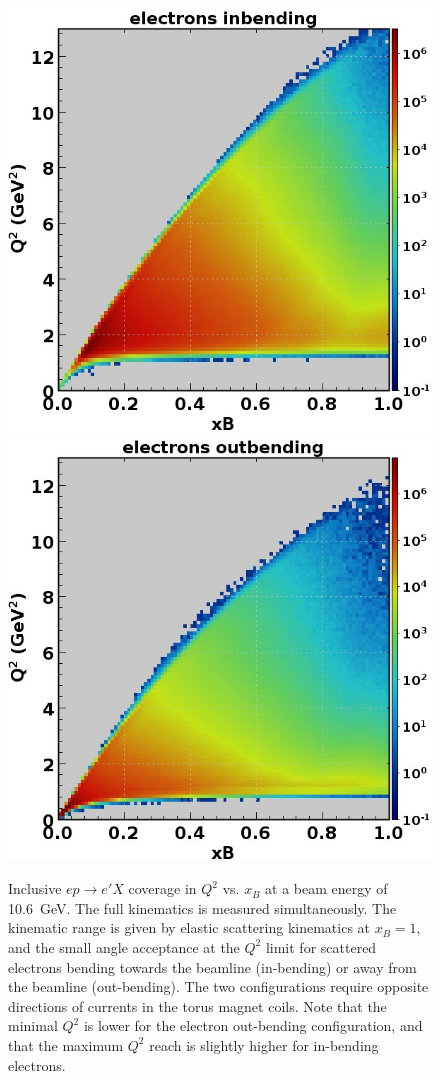 \documentclass[final,3p,twocolumn]{elsarticle}
\begin{document}
\begin{figure}[th!]
\includegraphics[width=0.9\columnwidth]{epX-in.jpg}
\vspace{0.3cm}
\includegraphics[width=0.9\columnwidth]{epX-out.jpg}
\caption{Inclusive $ep \to e'X$ coverage in $Q^2$ vs. $x_B$ at a beam energy of 10.6~GeV. The full kinematics is
  measured simultaneously. The kinematic range is given by elastic scattering kinematics at $x_B = 1$, and the small
  angle acceptance at the $Q^2$ limit for scattered electrons bending towards the beamline (in-bending) or away
  from the beamline (out-bending). The two configurations require opposite directions of currents in the torus magnet
  coils. Note that the minimal $Q^2$ is lower for the electron out-bending configuration, and that the maximum $Q^2$
  reach is slightly higher for in-bending electrons.} 
\label{electron-acceptance}
\end{figure}
\end{document}
